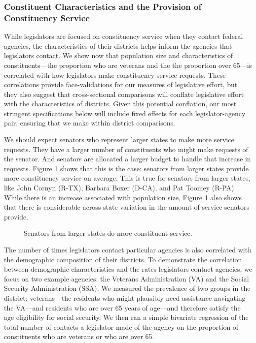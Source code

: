 \documentclass[12pt]{article}
\begin{document}
\subsubsection{Constituent Characteristics and the Provision of Constituency Service }

While legislators are focused on constituency service when they contact federal agencies, the characteristics of their districts helps inform the agencies that legislators contact. We show now that population size and characteristics of constituents---the proportion who are veterans and the the proportion over 65---is correlated with how legislators make constituency service requests. These correlations provide face-validations for our measures of legislative effort, but they also suggest that cross-sectional comparisons will conflate legislative effort with the characteristics of districts. Given this potential conflation, our most stringent specifications below will include fixed effects for each legislator-agency pair, ensuring that we make within district comparisons.  

We should expect senators who represent larger states to make more service requests. They have a larger number of constituents who might make requests of the senator. And senators are allocated a larger budget to handle that increase in requests. Figure \ref{f:stateSize} shows that this is the case: senators from larger states provide more constituency service on average. This is true for senators from larger states, like John Cornyn (R-TX), Barbara Boxer (D-CA), and Pat Toomey (R-PA). While there is an increase associated with population size, Figure \ref{f:stateSize} also shows that there is considerable across state variation in the amount of service senators provide.  

\begin{figure}
\centering
\caption{Senators from larger states do more constituent service.} \label{f:stateSize}
\end{figure}

The number of times legislators contact particular agencies is also correlated with the demographic composition of their districts. To demonstrate the correlation between demographic characteristics and the rates legislators contact agencies, we focus on two example agencies: the Veterans Administration (VA) and the Social Security Administration (SSA). We measured the prevalence of two groups in the district: veterans---the residents who might plausibly need assistance navigating the VA---and residents who are over 65 years of age---and therefore satisfy the age eligibility for social security. We then ran a simple bivariate regression of the total number of contacts a legislator made of the agency on the proportion of constituents who are veterans or who are over 65.  
\end{document}
